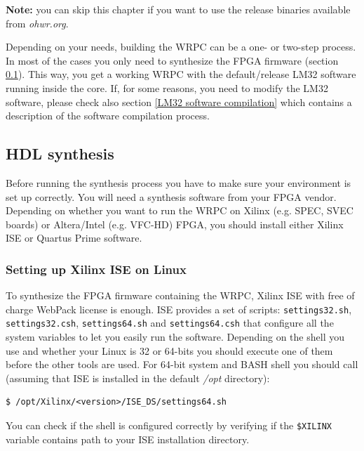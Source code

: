 \documentclass[a4paper, 12pt]{article}
\renewcommand{\_}{\underscore\allowbreak}
\begin{document}
\textbf{Note:} you can skip this chapter if you want to use the release binaries
available from \textit{ohwr.org}.

\vspace{1em}
Depending on your needs, building the WRPC can be a one- or two-step process.
In most of the cases you only need to synthesize the FPGA firmware (section
\ref{HDL synthesis}). This way, you get a working WRPC with the default/release
LM32 software running inside the core. If, for some reasons, you need to modify
the LM32 software, please check also section \ref{LM32 software compilation}
which contains a description of the software compilation process.

\subsection{HDL synthesis}
\label{HDL synthesis}

Before running the synthesis process you have to make sure your environment is
set up correctly. You will need a synthesis software from your FPGA vendor.
Depending on whether you want to run the WRPC on Xilinx (e.g. SPEC, SVEC boards) or
Altera/Intel (e.g. VFC-HD) FPGA, you should install either Xilinx ISE or Quartus
Prime software.

\subsubsection{Setting up Xilinx ISE on Linux}
\label{Setting up Xilinx ISE}
To synthesize the FPGA firmware containing the WRPC, Xilinx ISE with free of
charge WebPack license is enough. ISE provides a set of scripts:
\texttt{settings32.sh}, \texttt{settings32.csh}, \texttt{settings64.sh} and
\texttt{settings64.csh} that configure all the system variables to let you
easily run the software. Depending on the shell you use and whether your Linux is
32 or 64-bits you should execute one of them before the other tools are used.
For 64-bit system and BASH shell you should call (assuming that ISE is installed
in the default \textit{/opt} directory):
\begin{lstlisting}
$ /opt/Xilinx/<version>/ISE_DS/settings64.sh
\end{lstlisting}

You can check if the shell is configured correctly by verifying if the
\texttt{\$XILINX} variable contains path to your ISE installation directory.
\end{document}
